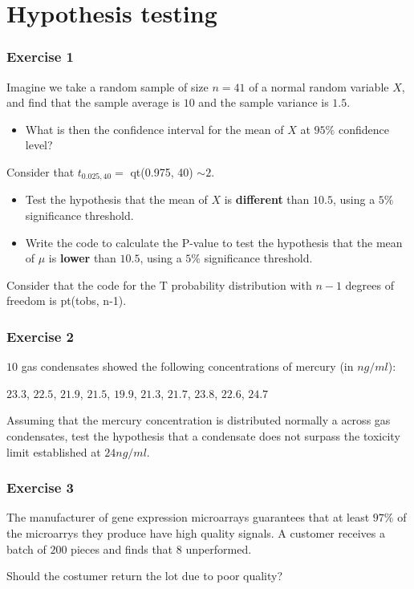 \documentclass[
]{book}
\providecommand{\tightlist}{%
  \setlength{\itemsep}{0pt}\setlength{\parskip}{0pt}}
\begin{document}
\hypertarget{hypothesis-testing}{%
\section{Hypothesis testing}\label{hypothesis-testing}}

\hypertarget{exercise-1-10}{%
\subsubsection{Exercise 1}\label{exercise-1-10}}

Imagine we take a random sample of size \(n = 41\) of a normal random variable \(X\), and find that the sample average is \(10\) and the sample variance is \(1.5\).

\begin{itemize}
\tightlist
\item
  What is then the confidence interval for the mean of \(X\) at \(95\%\) confidence level?
\end{itemize}

Consider that \(t_{0.025,40}=\) qt(0.975, 40) \(\sim 2\).

\begin{itemize}
\item
  Test the hypothesis that the mean of \(X\) is \textbf{different} than \(10.5\), using a \(5\%\) significance threshold.
\item
  Write the code to calculate the P-value to test the hypothesis that the mean of \(\mu\) is \textbf{lower} than \(10.5\), using a \(5\%\) significance threshold.
\end{itemize}

Consider that the code for the T probability distribution with \(n-1\) degrees of freedom is pt(tobs, n-1).

\hypertarget{exercise-2-10}{%
\subsubsection{Exercise 2}\label{exercise-2-10}}

\(10\) gas condensates showed the following concentrations of mercury (in \(ng/ml\)):

\(23.3\), \(22.5\), \(21.9\), \(21.5\), \(19.9\), \(21.3\), \(21.7\), \(23.8\), \(22.6\), \(24.7\)

Assuming that the mercury concentration is distributed normally a across gas condensates, test the hypothesis that a condensate does not surpass the toxicity limit established at \(24 ng/ml\).

\hypertarget{exercise-3-7}{%
\subsubsection{Exercise 3}\label{exercise-3-7}}

The manufacturer of gene expression microarrays guarantees that at least \(97\%\) of the microarrys they produce have high quality signals. A customer receives a batch of \(200\) pieces and finds that \(8\) unperformed.

Should the costumer return the lot due to poor quality?

  
\end{document}
